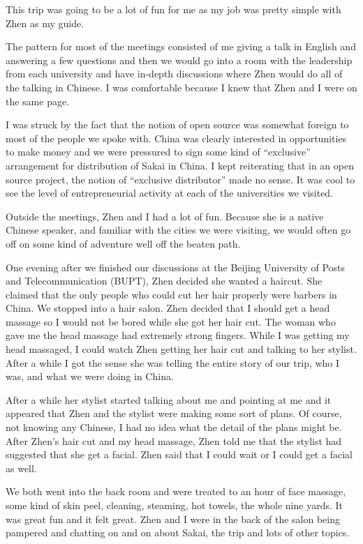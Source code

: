 \documentclass[12pt]{book}
\begin{document}
This trip was going to be a lot of fun for me as my job was
pretty simple with Zhen as my guide.

The pattern for most of the meetings consisted
of me giving a talk in English and answering a few questions
and then we would go into a room with the leadership from
each university and have in-depth discussions where Zhen would
do all of the talking in Chinese.  I was comfortable
because I knew that Zhen and I were on the same page.

I was struck by the fact that the notion of open source was
somewhat foreign to most of the people we spoke with.   China
was clearly interested in opportunities to make money and
we were pressured to sign some kind of ``exclusive'' arrangement
for distribution of Sakai in China.   I kept reiterating that
in an open source project, the notion of ``exclusive distributor''
made no sense.   It was cool to see the level of entrepreneurial
activity at each of the universities we visited.

Outside the meetings, Zhen and I had a lot of fun.   Because she is
a native Chinese speaker, and familiar with the cities we were
visiting, we would often go off on some kind of adventure well off
the beaten path.

One evening after we finished our discussions at the Beijing University
of Posts and Telecommunication (BUPT), Zhen decided she wanted a haircut.
She claimed that the only people who could cut her hair properly were
barbers in China.   We stopped into a hair salon.
Zhen decided that I should get a head massage so I would not be
bored while she got her hair cut.  The woman who gave me the head massage
had extremely strong fingers.  While I was getting my head massaged,
I could watch Zhen getting her hair cut and talking to her stylist.
After a while I got the sense she was telling the entire story of our trip,
who I was, and what we were doing in China.

After a while her stylist started talking about me and pointing at me and
it appeared that Zhen and the stylist were making some sort of plans.
Of course, not knowing any Chinese, I had no idea what the detail of the plans
might be.   After Zhen's hair cut and my head massage, Zhen
told me that the stylist had suggested that she get a facial.
Zhen said that I could wait or I could get a facial as well.

We both went into the back room and were treated to an hour of face massage,
some kind of skin peel, cleaning, steaming, hot towels, the whole nine yards.
It was great fun and it felt great.  Zhen and I were in the back of the salon
being pampered and chatting on and on about Sakai, the trip and lots of other
topics.
\end{document}
